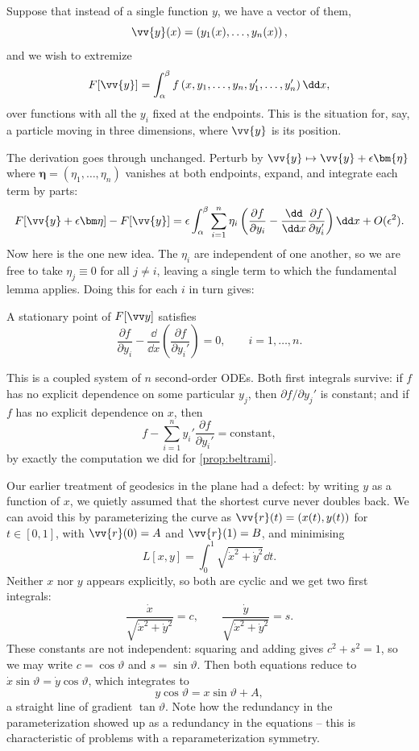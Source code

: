 Suppose that instead of a single function $y$, we have a vector of them,
$$
\vv{y}(x) = \left(y_1(x), \dots, y_n(x)\right),
$$
and we wish to extremize
$$
F[\vv{y}] = \int_\alpha^\beta f\left(x, y_1, \dots, y_n, y_1', \dots, y_n'\right)\dd x,
$$
over functions with all the $y_i$ fixed at the endpoints. This is the situation for, say, a particle moving in three dimensions, where $\vv{y}$ is its position.

The derivation goes through unchanged. Perturb by $\vv{y} \mapsto \vv{y} + \epsilon \bm{\eta}$ where $\bm\eta = (\eta_1, \dots, \eta_n)$ vanishes at both endpoints, expand, and integrate each term by parts:
$$
F[\vv{y} + \epsilon\bm\eta] - F[\vv{y}] = \epsilon\int_\alpha^\beta \sum_{i=1}^n \eta_i \left(\frac{\partial f}{\partial y_i} - \frac{\dd}{\dd x}\frac{\partial f}{\partial y_i'}\right)\dd x + O(\epsilon^2).
$$
Now here is the one new idea. The $\eta_i$ are independent of one another, so we are free to take $\eta_j \equiv 0$ for all $j \neq i$, leaving a single term to which the fundamental lemma applies. Doing this for each $i$ in turn gives:

\begin{theorem}
	A stationary point of $F[\vv y]$ satisfies
	$$
	\frac{\partial f}{\partial y_i} - \frac{\dd}{\dd x}\left(\frac{\partial f}{\partial y_i'}\right) = 0, \qquad i = 1, \dots, n.
	$$
\end{theorem}

This is a coupled system of $n$ second-order ODEs. Both first integrals survive: if $f$ has no explicit dependence on some particular $y_j$, then $\partial f/\partial y_j' $ is constant; and if $f$ has no explicit dependence on $x$, then
$$
f - \sum_{i=1}^n y_i' \frac{\partial f}{\partial y_i'} = \text{constant},
$$
by exactly the computation we did for \autoref{prop:beltrami}.

\begin{example}
	Our earlier treatment of geodesics in the plane had a defect: by writing $y$ as a function of $x$, we quietly assumed that the shortest curve never doubles back. We can avoid this by parameterizing the curve as $\vv{r}(t) = (x(t), y(t))$ for $t \in [0,1]$, with $\vv{r}(0) = A$ and $\vv{r}(1) = B$, and minimising
	$$
	L[x, y] = \int_0^1 \sqrt{\dot x^2 + \dot y^2}\dd t.
	$$
	Neither $x$ nor $y$ appears explicitly, so both are cyclic and we get two first integrals:
	$$
	\frac{\dot x}{\sqrt{\dot x^2 + \dot y^2}} = c, \qquad \frac{\dot y}{\sqrt{\dot x^2 + \dot y^2}} = s.
	$$
	These constants are not independent: squaring and adding gives $c^2 + s^2 = 1$, so we may write $c = \cos\vartheta$ and $s = \sin\vartheta$. Then both equations reduce to $\dot x \sin\vartheta = \dot y \cos\vartheta$, which integrates to
	$$
	y\cos\vartheta = x \sin\vartheta + A,
	$$
	a straight line of gradient $\tan\vartheta$. Note how the redundancy in the parameterization showed up as a redundancy in the equations -- this is characteristic of problems with a reparameterization symmetry.
\end{example}

